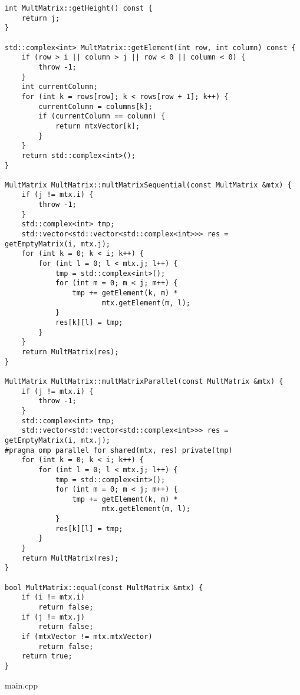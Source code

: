 \documentclass{report}
\begin{document}
\begin{lstlisting}
int MultMatrix::getHeight() const {
    return j;
}

std::complex<int> MultMatrix::getElement(int row, int column) const {
    if (row > i || column > j || row < 0 || column < 0) {
        throw -1;
    }
    int currentColumn;
    for (int k = rows[row]; k < rows[row + 1]; k++) {
        currentColumn = columns[k];
        if (currentColumn == column) {
            return mtxVector[k];
        }
    }
    return std::complex<int>();
}

MultMatrix MultMatrix::multMatrixSequential(const MultMatrix &mtx) {
    if (j != mtx.i) {
        throw -1;
    }
    std::complex<int> tmp;
    std::vector<std::vector<std::complex<int>>> res = getEmptyMatrix(i, mtx.j);
    for (int k = 0; k < i; k++) {
        for (int l = 0; l < mtx.j; l++) {
            tmp = std::complex<int>();
            for (int m = 0; m < j; m++) {
                tmp += getElement(k, m) *
                       mtx.getElement(m, l);
            }
            res[k][l] = tmp;
        }
    }
    return MultMatrix(res);
}

MultMatrix MultMatrix::multMatrixParallel(const MultMatrix &mtx) {
    if (j != mtx.i) {
        throw -1;
    }
    std::complex<int> tmp;
    std::vector<std::vector<std::complex<int>>> res = getEmptyMatrix(i, mtx.j);
#pragma omp parallel for shared(mtx, res) private(tmp)
    for (int k = 0; k < i; k++) {
        for (int l = 0; l < mtx.j; l++) {
            tmp = std::complex<int>();
            for (int m = 0; m < j; m++) {
                tmp += getElement(k, m) *
                       mtx.getElement(m, l);
            }
            res[k][l] = tmp;
        }
    }
    return MultMatrix(res);
}

bool MultMatrix::equal(const MultMatrix &mtx) {
    if (i != mtx.i)
        return false;
    if (j != mtx.j)
        return false;
    if (mtxVector != mtx.mtxVector)
        return false;
    return true;
}

\end{lstlisting}
main.cpp
\end{document}
